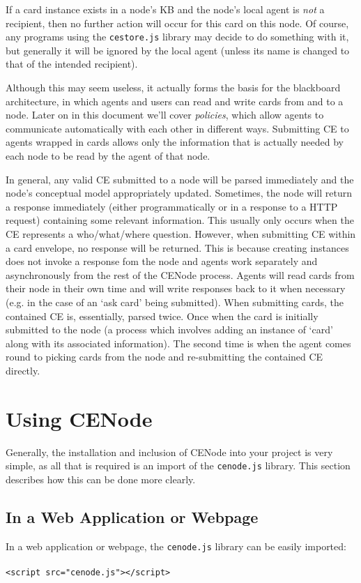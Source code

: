 \documentclass{scrartcl}
\newcommand{\js}[1]{\texttt{#1}}
\begin{document}
If a card instance exists in a node's KB and the node's local agent is \textit{not} a recipient, then no further action will occur for this card on this node. Of course, any programs using the \js{cestore.js} library may decide to do something with it, but generally it will be ignored by the local agent (unless its name is changed to that of the intended recipient).

Although this may seem useless, it actually forms the basis for the blackboard architecture, in which agents and users can read and write cards from and to a node. Later on in this document we'll cover \textit{policies}, which allow agents to communicate automatically with each other in different ways. Submitting CE to agents wrapped in cards allows only the information that is actually needed by each node to be read by the agent of that node.

In general, any valid CE submitted to a node will be parsed immediately and the node's conceptual model appropriately updated. Sometimes, the node will return a response immediately (either programmatically or in a response to a HTTP request) containing some relevant information. This usually only occurs when the CE represents a who/what/where question. However, when submitting CE within a card envelope, no response will be returned. This is because creating instances does not invoke a response fom the node and agents work separately and asynchronously from the rest of the CENode process. Agents will read cards from their node in their own time and will write responses back to it when necessary (e.g. in the case of an `ask card' being submitted). When submitting cards, the contained CE is, essentially, parsed twice. Once when the card is initially submitted to the node (a process which involves adding an instance of `card' along with its associated information). The second time is when the agent comes round to picking cards from the node and re-submitting the contained CE directly.


\section{Using CENode}
Generally, the installation and inclusion of CENode into your project is very simple, as all that is required is an import of the \js{cenode.js} library. This section describes how this can be done more clearly.

\subsection{In a Web Application or Webpage}
\label{as_a_webapp}
In a web application or webpage, the \js{cenode.js} library can be easily imported:\\
\\\js{<script src="cenode.js"></script>}\\
\end{document}
